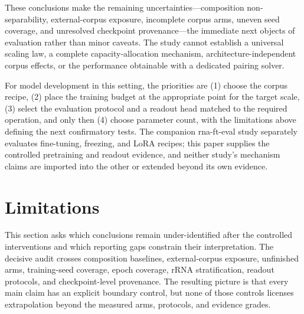 These conclusions make the remaining uncertainties---composition non-separability, external-corpus exposure, incomplete corpus arms, uneven seed coverage, and unresolved checkpoint provenance---the immediate next objects of evaluation rather than minor caveats. The study cannot establish a universal scaling law, a complete capacity-allocation mechanism, architecture-independent corpus effects, or the performance obtainable with a dedicated pairing solver.

For model development in this setting, the priorities are (1) choose the corpus recipe, (2) place the training budget at the appropriate point for the target scale, (3) select the evaluation protocol and a readout head matched to the required operation, and only then (4) choose parameter count, with the limitations above defining the next confirmatory tests. The companion rna-ft-eval study separately evaluates fine-tuning, freezing, and LoRA recipes; this paper supplies the controlled pretraining and readout evidence, and neither study's mechanism claims are imported into the other or extended beyond its own evidence.

\hypertarget{limitations}{%
\section{Limitations}\label{limitations}}

This section asks which conclusions remain under-identified after the controlled interventions and which reporting gaps constrain their interpretation. The decisive audit crosses composition baselines, external-corpus exposure, unfinished arms, training-seed coverage, epoch coverage, rRNA stratification, readout protocols, and checkpoint-level provenance. The resulting picture is that every main claim has an explicit boundary control, but none of those controls licenses extrapolation beyond the measured arms, protocols, and evidence grades.

